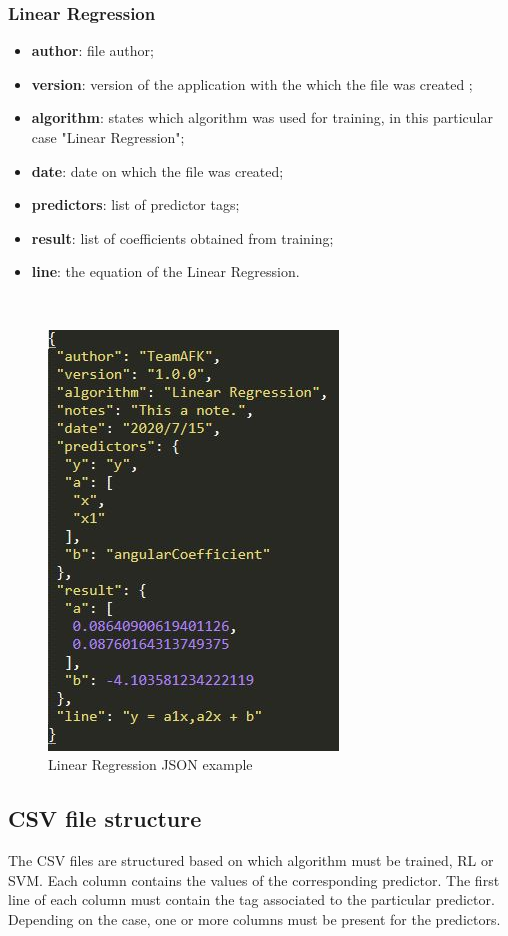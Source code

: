 \subsubsection{Linear Regression}
\begin{itemize}
	\item \textbf{author}: file author;
	\item \textbf{version}: version of the application with the which the file was created ;
	\item \textbf{algorithm}: states which algorithm was used for training, in this particular case "Linear Regression";
	\item \textbf{date}: date on which the file was created;
	\item \textbf{predictors}:  list of predictor tags;
	\item \textbf{result}: list of coefficients obtained from training;
	\item \textbf{line}: the equation of the Linear Regression.
\end{itemize}
\hspace{5cm}\\
\begin{figure}[H]
\centering
\includegraphics[scale=0.75]{img/json/jsonRL.JPG}
\caption{Linear Regression JSON example}
\end{figure}
\pagebreak

\subsection{CSV file structure}
The CSV files are structured based on which algorithm must be trained, RL or SVM.
Each column contains the values of the corresponding predictor\glo. The first line  of each column must contain the tag associated to the particular predictor. Depending on the case, one or more columns must be present for the predictors.


